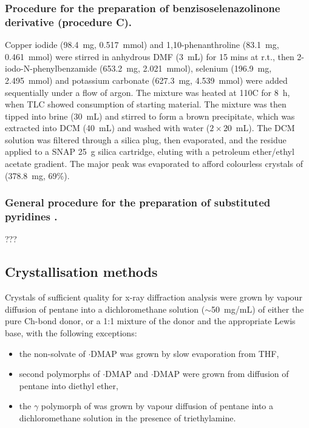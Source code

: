 \begin{refsection}
\subsubsection[General procedure C]{Procedure for the preparation of benzisoselenazolinone derivative  (procedure C).}
Copper iodide (98.4~mg, 0.517~mmol) and 1,10-phenanthroline (83.1~mg, 0.461~mmol) were stirred in anhydrous DMF (3~mL) for 15 mins at r.t., then 2-iodo-N-phenylbenz\-amide (653.2~mg, 2.021~mmol), selenium (196.9~mg, 2.495~mmol) and potassium carbonate (627.3~mg, 4.539~mmol) were added sequentially under a flow of argon.
The mixture was heated at 110\degree{}C for 8~h, when TLC showed consumption of starting material.
The mixture was then tipped into brine (30~mL) and stirred to form a brown precipitate, which was extracted into DCM (40~mL) and washed with water ($ 2 \times 20 $~mL).
The DCM solution was filtered through a silica plug, then evaporated, and the residue applied to a SNAP 25~g silica cartridge, eluting with a petroleum ether/ethyl acetate gradient.
The major peak was evaporated to afford colourless crystals of  (378.8~mg, 69\%).

\subsubsection[General procedure for substituted pyridines]{General procedure for the preparation of substituted pyridines .}
???


\subsection{Crystallisation methods}
Crystals of sufficient quality for x-ray diffraction analysis were grown by vapour diffusion of pentane into a dichloromethane solution ($\sim$50~mg/mL) of either the pure Ch-bond donor, or a 1:1 mixture of the donor and the appropriate Lewis base, with the following exceptions:
\begin{itemize}
    \item the non-solvate of $ \cdot $DMAP was grown by slow evaporation from THF,
    \item second polymorphs of $ \cdot $DMAP and $ \cdot $DMAP were grown from diffusion of pentane into diethyl ether,
    \item the $\gamma$ polymorph of  was grown by vapour diffusion of pentane into a dichloro\-methane solution in the presence of triethylamine.
\end{itemize}


\end{refsection}

